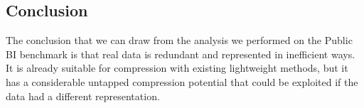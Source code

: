 \subsection{Conclusion}
The conclusion that we can draw from the analysis we performed on the Public BI benchmark is that real data is redundant and represented in inefficient ways. It is already suitable for compression with existing lightweight methods, but it has a considerable untapped compression potential that could be exploited if the data had a different representation.

\iffalse
- scatter plot with skewness and kurtosis on distribution types background (see link from Benno) (Min/Max; Outliers characterisation; standard deviation; check if normal distribution; (in terms of distribution of numbers, dates, length of strings, character sets used, etc); metrics: range & standard deviation, mean (big skew = large range & big stdev), measures of spread = range and stdev)
\fi

